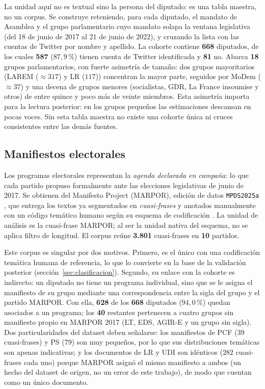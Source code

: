 La unidad aquí no es textual sino la persona del diputado: es una tabla maestra,
no un corpus. Se construye reteniendo, para cada diputado, el mandato de Asamblea
y el grupo parlamentario cuyo mandato solapa la ventana legislativa (del 18 de
junio de 2017 al 21 de junio de 2022), y cruzando la lista con las cuentas de
Twitter por nombre y apellido. La cohorte contiene \textbf{668} diputados, de los
cuales \textbf{587} ($87{,}9\,\%$) tienen cuenta de Twitter identificada y
\textbf{81} no. Abarca \textbf{18} grupos parlamentarios, con fuerte asimetría de
tamaño: dos grupos mayoritarios (LAREM ($\approx 317$) y LR ($117$))
concentran la mayor parte, seguidos por MoDem ($\approx 37$) y una decena de
grupos menores (socialistas, GDR, La France insoumise y otros) de entre quince y
poco más de veinte miembros. Esta asimetría importa para la lectura posterior: en
los grupos pequeños las estimaciones descansan en pocas voces. Sin esta tabla
maestra no existe una cohorte única ni cruces consistentes entre las demás
fuentes.

\subsection{Manifiestos electorales}
\label{sec:corpus-manifestos}

Los programas electorales representan la \emph{agenda declarada en campaña}: lo
que cada partido propuso formalmente ante las elecciones legislativas de junio de
2017. Se obtienen del Manifesto Project (MARPOR), edición de datos
\texttt{MPDS2025a} \cite{marpor_mpds2025a}, que entrega los textos ya segmentados
en \emph{cuasi-frases} y anotados manualmente con un código temático humano según
su esquema de codificación \cite{marpor_mp_v5}. La unidad de análisis es la
cuasi-frase MARPOR; al ser la unidad nativa del esquema, no se aplica filtro de
longitud. El corpus reúne \textbf{3.801} cuasi-frases en \textbf{10} partidos.

Este corpus es singular por dos motivos. Primero, es el único con una
codificación temática humana de referencia, lo que lo
convierte en la base de la validación posterior
(sección~\ref{sec:clasificacion}). Segundo, su enlace con la cohorte es
indirecto: un diputado no tiene un programa individual, sino que se le asigna el
manifiesto de su grupo mediante una correspondencia entre la sigla del grupo y el
partido MARPOR. Con ella, \textbf{628} de los \textbf{668} diputados ($94{,}0\,\%$)
quedan asociados a un programa; los \textbf{40} restantes pertenecen a cuatro
grupos sin manifiesto propio en MARPOR 2017 (LT, EDS, AGIR-E y un grupo sin
sigla). Dos particularidades del dataset deben señalarse: los manifiestos de PCF
($39$ cuasi-frases) y PS ($79$) son muy pequeños, por lo que sus distribuciones
temáticas son apenas indicativas; y los documentos de LR y UDI son idénticos
($282$ cuasi-frases cada uno) porque MARPOR asignó el mismo manifiesto a ambos
(un hecho del dataset de origen, no un error de este trabajo), de modo que
cuentan como un único documento.

